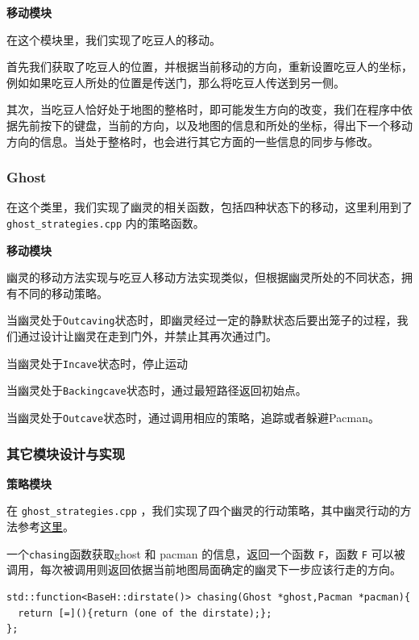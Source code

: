 \documentclass[UTF8,11pt]{ctexart}
\begin{document}
        \textbf{移动模块}
	    
        在这个模块里，我们实现了吃豆人的移动。
    
        首先我们获取了吃豆人的位置，并根据当前移动的方向，重新设置吃豆人的坐标，例如如果吃豆人所处的位置是传送门，那么将吃豆人传送到另一侧。
    
        其次，当吃豆人恰好处于地图的整格时，即可能发生方向的改变，我们在程序中依据先前按下的键盘，当前的方向，以及地图的信息和所处的坐标，得出下一个移动方向的信息。当处于整格时，也会进行其它方面的一些信息的同步与修改。

        \subsubsection{Ghost}
	    在这个类里，我们实现了幽灵的相关函数，包括四种状态下的移动，这里利用到了 \verb|ghost_strategies.cpp| 内的策略函数。
        
        \textbf{移动模块}
	    
        幽灵的移动方法实现与吃豆人移动方法实现类似，但根据幽灵所处的不同状态，拥有不同的移动策略。
    
        当幽灵处于\verb|Outcaving|状态时，即幽灵经过一定的静默状态后要出笼子的过程，我们通过设计让幽灵在走到门外，并禁止其再次通过门。
    
        当幽灵处于\verb|Incave|状态时，停止运动
    
        当幽灵处于\verb|Backingcave|状态时，通过最短路径返回初始点。
    
        当幽灵处于\verb|Outcave|状态时，通过调用相应的策略，追踪或者躲避Pacman。

        \subsubsection{其它模块设计与实现}
    
        \textbf{策略模块}
	
        在 \verb|ghost_strategies.cpp| ，我们实现了四个幽灵的行动策略，其中幽灵行动的方法参考\href{https://www.mentalfloss.com/article/90874/your-pac-man-game-learning-different-strategies-each-ghost}{这里}。
	
        一个\verb|chasing|函数获取ghost 和 pacman 的信息，返回一个函数 \verb|F|，函数 \verb|F| 可以被调用，每次被调用则返回依据当前地图局面确定的幽灵下一步应该行走的方向。
        \begin{lstlisting}
std::function<BaseH::dirstate()> chasing(Ghost *ghost,Pacman *pacman){
  return [=](){return (one of the dirstate);};
};            
        \end{lstlisting}
\end{document}
